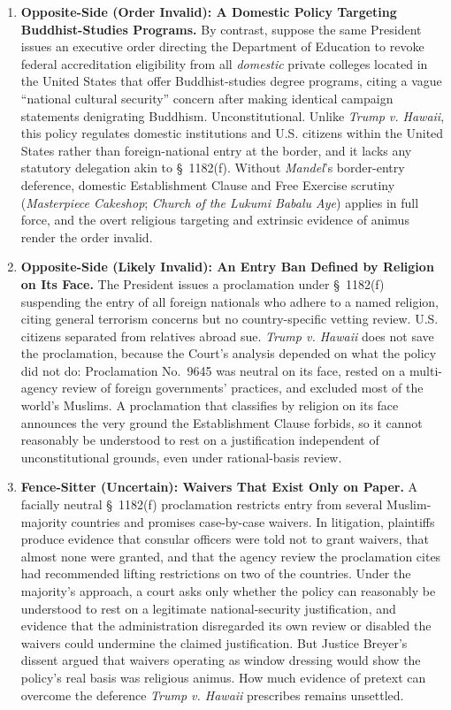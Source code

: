 \documentclass[12pt]{article}
\begin{document}
\begin{enumerate}
\item \textbf{Opposite-Side (Order Invalid): A Domestic Policy Targeting Buddhist-Studies Programs.} By contrast, suppose the same President issues an executive order directing the Department of Education to revoke federal accreditation eligibility from all \textit{domestic} private colleges located in the United States that offer Buddhist-studies degree programs, citing a vague ``national cultural security'' concern after making identical campaign statements denigrating Buddhism. Unconstitutional. Unlike \textit{Trump v. Hawaii}, this policy regulates domestic institutions and U.S. citizens within the United States rather than foreign-national entry at the border, and it lacks any statutory delegation akin to \S~1182(f). Without \textit{Mandel}'s border-entry deference, domestic Establishment Clause and Free Exercise scrutiny (\textit{Masterpiece Cakeshop}; \textit{Church of the Lukumi Babalu Aye}) applies in full force, and the overt religious targeting and extrinsic evidence of animus render the order invalid.

\item \textbf{Opposite-Side (Likely Invalid): An Entry Ban Defined by Religion on Its Face.} The President issues a proclamation under \S~1182(f) suspending the entry of all foreign nationals who adhere to a named religion, citing general terrorism concerns but no country-specific vetting review. U.S. citizens separated from relatives abroad sue. \textit{Trump v. Hawaii} does not save the proclamation, because the Court's analysis depended on what the policy did not do: Proclamation No.~9645 was neutral on its face, rested on a multi-agency review of foreign governments' practices, and excluded most of the world's Muslims. A proclamation that classifies by religion on its face announces the very ground the Establishment Clause forbids, so it cannot reasonably be understood to rest on a justification independent of unconstitutional grounds, even under rational-basis review.

\item \textbf{Fence-Sitter (Uncertain): Waivers That Exist Only on Paper.} A facially neutral \S~1182(f) proclamation restricts entry from several Muslim-majority countries and promises case-by-case waivers. In litigation, plaintiffs produce evidence that consular officers were told not to grant waivers, that almost none were granted, and that the agency review the proclamation cites had recommended lifting restrictions on two of the countries. Under the majority's approach, a court asks only whether the policy can reasonably be understood to rest on a legitimate national-security justification, and evidence that the administration disregarded its own review or disabled the waivers could undermine the claimed justification. But Justice Breyer's dissent argued that waivers operating as window dressing would show the policy's real basis was religious animus. How much evidence of pretext can overcome the deference \textit{Trump v. Hawaii} prescribes remains unsettled.

\end{enumerate}
\end{document}
